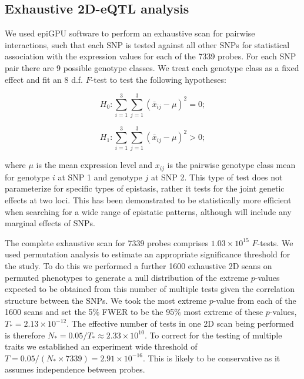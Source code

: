 \documentclass{article}
\begin{document}
\subsection{Exhaustive 2D-eQTL analysis}

We used epiGPU software to perform an exhaustive scan for pairwise interactions, such that each SNP is tested against all other SNPs for statistical association with the expression values for each of the 7339 probes. For each SNP pair there are 9 possible genotype classes. We treat each genotype class as a fixed effect and fit an 8 d.f. $F$-test to test the following hypotheses:

\begin{equation}
H _0 : \sum _{i=1} ^3 \sum _{j=1} ^3 (\bar x _{ij} - \mu) ^2 = 0; 
\end{equation}

\begin{equation}
H _1 : \sum _{i=1} ^3 \sum _{j=1} ^3 (\bar x _{ij} - \mu) ^2 > 0; 
\label{eq:8df}
\end{equation}

where $\mu$ is the mean expression level and $x _{ij}$ is the pairwise genotype class mean for genotype $i$ at SNP 1 and genotype $j$ at SNP 2. This type of test does not parameterize for specific types of epistasis, rather it tests for the joint genetic effects at two loci. This has been demonstrated to be statistically more efficient when searching for a wide range of epistatic patterns, although will include any marginal effects of SNPs.
 
The complete exhaustive scan for 7339 probes comprises $1.03 \times 10^{15}$ $F$-tests. We used permutation analysis to estimate an appropriate significance threshold for the study. To do this we performed a further 1600 exhaustive 2D scans on permuted phenotypes to generate a null distribution of the extreme $p$-values expected to be obtained from this number of multiple tests given the correlation structure between the SNPs. We took the most extreme $p$-value from each of the 1600 scans and set the 5\% FWER to be the 95\% most extreme of these $p$-values, $T_{*} = 2.13 \times 10^{-12}$. The effective number of tests in one 2D scan being performed is therefore $N_{*} = 0.05 / T_{*} \approx 2.33 \times 10^{10}$. To correct for the testing of multiple traits we established an experiment wide threshold of $T = 0.05 / (N_{*} \times 7339) = 2.91 \times 10^{-16}$. This is likely to be conservative as it assumes independence between probes.
\end{document}
